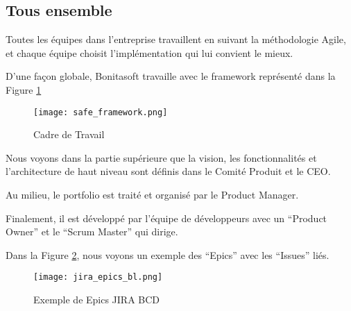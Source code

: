 \subsection{Tous ensemble}

Toutes les équipes dans l'entreprise travaillent en suivant la méthodologie Agile, et chaque équipe choisit l'implémentation qui lui convient le mieux.

D'une façon globale, Bonitasoft travaille avec le framework représenté dans la Figure \ref{frame_safe}

\begin{figure}[!ht]
\advance\leftskip-2cm
\texttt{[image: safe\_framework.png]}
\caption{Cadre de Travail \cite{safe}}
\label{frame_safe}
\end{figure}

Nous voyons dans la partie supérieure que la vision, les fonctionnalités et l'architecture de haut niveau sont définis dans le Comité Produit et le CEO.

Au milieu, le portfolio est traité et organisé par le Product Manager.

Finalement, il est développé par l'équipe de développeurs avec un \enquote{Product Owner} et le \enquote{Scrum Master} qui dirige.

Dans la Figure \ref{fig:example_epic}, nous voyons un exemple des \enquote{Epics} avec les \enquote{Issues} liés.
\begin{figure}[!ht]
\centering
\texttt{[image: jira\_epics\_bl.png]}
\caption{Exemple de Epics JIRA BCD}
\label{fig:example_epic}
\end{figure}
